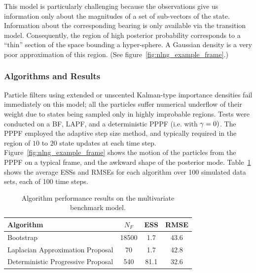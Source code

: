 \documentclass{article}
\begin{document}
This model is particularly challenging because the observations give us information only about the magnitudes of a set of sub-vectors of the state. Information about the corresponding bearing is only available via the transition model. Consequently, the region of high posterior probability corresponds to a ``thin'' section of the space bounding a hyper-sphere. A Gaussian density is a very poor approximation of this region. (See figure~\ref{fig:nlng_example_frame}.)

\subsubsection{Algorithms and Results}

Particle filters using extended or unscented Kalman-type importance densities fail immediately on this model; all the particles suffer numerical underflow of their weight due to states being sampled only in highly improbable regions. Tests were conducted on a BF, LAPF, and a deterministic PPPF (i.e. with $\gamma=0)$. The PPPF employed the adaptive step size method, and typically required in the region of $10$ to $20$ state updates at each time step. Figure~\ref{fig:nlng_example_frame} shows the motion of the particles from the PPPF on a typical frame, and the awkward shape of the posterior mode. Table~\ref{tab:nlng_results} shows the average ESSs and RMSEs for each algorithm over 100 simulated data sets, each of 100 time steps.
%
\begin{table}
\centering
\begin{tabular}{l||c|c|c}
Algorithm                                & $N_F$ & ESS  & RMSE \\
\hline
Bootstrap                                & 18500 &  1.7 & 43.6 \\
Laplacian Approximation Proposal         &    70 &  1.7 & 42.8 \\
Deterministic Progressive Proposal       &   540 & 81.1 & 32.6 \\
\end{tabular}
\caption{Algorithm performance results on the multivariate benchmark model.}
\label{tab:nlng_results}
\end{table}
%
\end{document}
